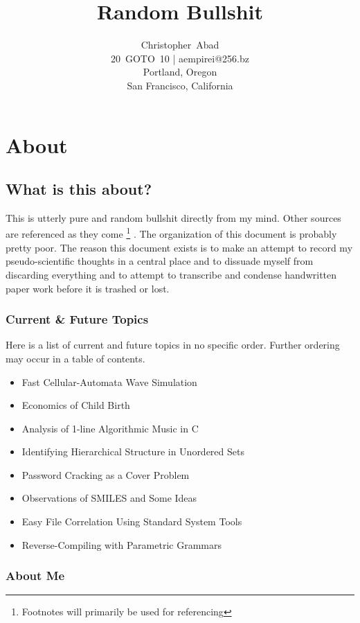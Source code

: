 \documentclass[11pt]{book}
\title{Random Bullshit}
\author{Christopher~Abad \\
20~GOTO~10 | aempirei@256.bz \\
Portland, Oregon \\
San Francisco, California }
\begin{document}
\maketitle

\chapter{About}

\section{What is this about?}

This is utterly pure and random bullshit directly from my mind. Other sources are referenced as they come%
\footnote{Footnotes will primarily be used for referencing}
.  The organization of this document is probably pretty poor. The reason this document exists is to make an attempt to record my pseudo-scientific thoughts in a central place and to dissuade myself from discarding everything and to attempt to transcribe and condense handwritten paper work before it is trashed or lost.

\subsection{Current \& Future Topics}

Here is a list of current and future topics in no specific order. Further ordering may occur in a table of contents.

\begin{itemize}
	\item Fast Cellular-Automata Wave Simulation
	\item Economics of Child Birth
	\item Analysis of 1-line Algorithmic Music in C
	\item Identifying Hierarchical Structure in Unordered Sets
	\item Password Cracking as a Cover Problem
	\item Observations of SMILES and Some Ideas
	\item Easy File Correlation Using Standard System Tools
	\item Reverse-Compiling with Parametric Grammars
\end{itemize}

\subsection{About Me}
\end{document}
